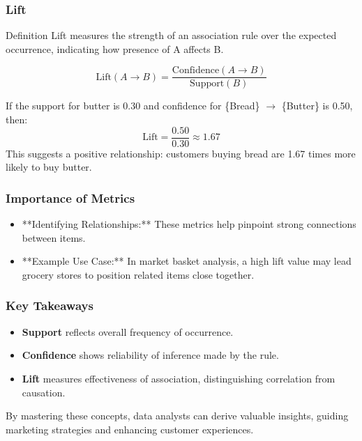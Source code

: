 \documentclass[aspectratio=169]{beamer}
\begin{document}
\begin{frame}[fragile]
    \frametitle{Lift}
    \begin{block}{Definition}
        Lift measures the strength of an association rule over the expected occurrence, indicating how presence of A affects B.
    \end{block}
    \begin{equation}
    \text{Lift}(A \rightarrow B) = \frac{\text{Confidence}(A \rightarrow B)}{\text{Support}(B)}
    \end{equation}

    \begin{example}
    If the support for butter is 0.30 and confidence for \{Bread\} $\rightarrow$ \{Butter\} is 0.50, then:
    \[
    \text{Lift} = \frac{0.50}{0.30} \approx 1.67
    \]
    This suggests a positive relationship: customers buying bread are 1.67 times more likely to buy butter.
    \end{example}
\end{frame}

\begin{frame}[fragile]
    \frametitle{Importance of Metrics}
    \begin{itemize}
        \item **Identifying Relationships:** These metrics help pinpoint strong connections between items.
        \item **Example Use Case:** In market basket analysis, a high lift value may lead grocery stores to position related items close together.
    \end{itemize}
\end{frame}

\begin{frame}[fragile]
    \frametitle{Key Takeaways}
    \begin{itemize}
        \item \textbf{Support} reflects overall frequency of occurrence.
        \item \textbf{Confidence} shows reliability of inference made by the rule.
        \item \textbf{Lift} measures effectiveness of association, distinguishing correlation from causation.
    \end{itemize}

    By mastering these concepts, data analysts can derive valuable insights, guiding marketing strategies and enhancing customer experiences.
\end{frame}
\end{document}
